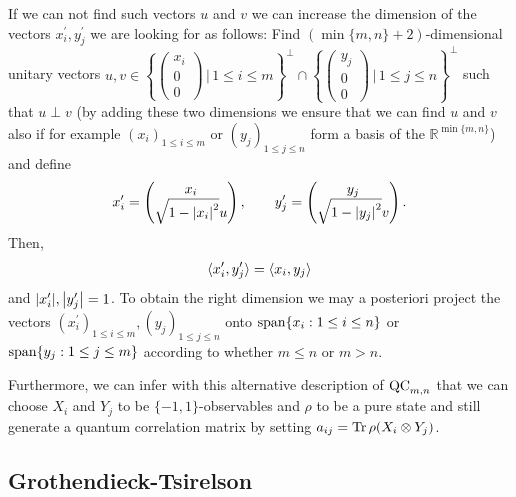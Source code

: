 \begin{rmk}
		If we can not find such vectors $u$ and $v$ we can increase the dimension of the vectors $x_i^\prime,y_j^\prime$ we are looking for as follows: Find $(\min\{m,n\}+2)$-dimensional unitary vectors $u,v\in\left\{\begin{pmatrix} x_i \\ 0 \\ 0 \end{pmatrix} \,\bigg| \, 1\leq i \leq m\right\}^\perp \cap \left\{\begin{pmatrix} y_j \\ 0 \\ 0 \end{pmatrix}\,\bigg| \, 1\leq j \leq n\right\}^\perp$ such that $u\perp v$ (by adding these two dimensions we ensure that we can find $u$ and $v$ also if for example $(x_i)_{1\leq i \leq m}$ or $(y_j)_{1\leq j \leq n}$ form a basis of the $\mathbb{R}^{\min\{m,n\}}$) and define 
		\begin{align*}
			x_i^\prime = \begin{pmatrix}
				x_i \\ \sqrt{1-{\left|{x_i}\right|}^2}u
			\end{pmatrix},\qquad
			y_j^\prime = \begin{pmatrix}
				y_j \\ \sqrt{1-{\left|{y_j}\right|}^2}v
			\end{pmatrix}.
		\end{align*}
		Then,
		\begin{align*}
			\langle{x_i^\prime},{y_j^\prime}\rangle = \langle{x_i},{y_j}\rangle
		\end{align*}
		and ${\left|{x_i^\prime}\right|},{\left|{y_j^\prime}\right|}=1$.
		To obtain the right dimension we may a posteriori project the vectors $(x_i^\prime)_{1\leq i \leq m},(y_j)_{1\leq j \leq n}$ onto $\operatorname{span}\{x_i : 1\leq i \leq n\}$ or $\operatorname{span}\{y_j : 1\leq j \leq m\}$ according to whether $m\leq n$ or $m > n$.
		
		Furthermore, we can infer with this alternative description of $\textup{QC}_{m,n}$ that we can choose $X_i$ and $Y_j$ to be $\{-1,1\}$-observables and $\rho$ to be a pure state and still generate a quantum correlation matrix by setting $a_{ij} = \textup{Tr} \, {\rho(X_i\otimes Y_j)} $.
	\end{rmk}

\subsection{Grothendieck-Tsirelson}

